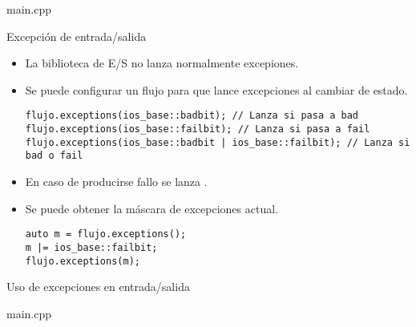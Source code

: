 \begin{frame}
\begin{block}{main.cpp}

\end{block}
\end{frame}

\begin{frame}[t,fragile]{Excepción de entrada/salida}
\begin{itemize}
  \item La biblioteca de E/S no lanza normalmente excepiones.
  \item Se puede configurar un flujo para que lance excepciones al cambiar de estado.
\begin{lstlisting}
flujo.exceptions(ios_base::badbit); // Lanza si pasa a bad
flujo.exceptions(ios_base::failbit); // Lanza si pasa a fail
flujo.exceptions(ios_base::badbit | ios_base::failbit); // Lanza si bad o fail
\end{lstlisting}
  \item En caso de producirse fallo se lanza .
  \item Se puede obtener la máscara de excepciones actual.
\begin{lstlisting}
auto m = flujo.exceptions();
m |= ios_base::failbit;
flujo.exceptions(m);
\end{lstlisting}
\end{itemize}
\end{frame}

\begin{frame}[t]{Uso de excepciones en entrada/salida}
\begin{block}{main.cpp}

\end{block}
\end{frame}
